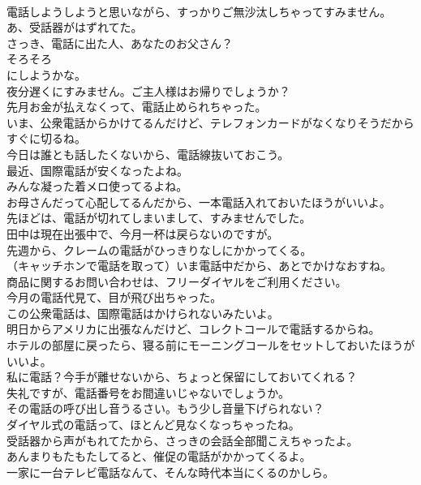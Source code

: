\documentclass[8pt]{extreport}
\begin{document}
\begin{CJK}{UTF8}{min}
\\	電話しようしようと思いながら、すっかりご無沙汰しちゃってすみません。	
\\	あ、受話器がはずれてた。	
\\	さっき、電話に出た人、あなたのお父さん？	
\\	そろそろ
\\	にしようかな。	
\\	夜分遅くにすみません。ご主人様はお帰りでしょうか？	
\\	先月お金が払えなくって、電話止められちゃった。	
\\	いま、公衆電話からかけてるんだけど、テレフォンカードがなくなりそうだからすぐに切るね。	
\\	今日は誰とも話したくないから、電話線抜いておこう。	
\\	最近、国際電話が安くなったよね。	
\\	みんな凝った着メロ使ってるよね。	
\\	お母さんだって心配してるんだから、一本電話入れておいたほうがいいよ。	
\\	先ほどは、電話が切れてしまいまして、すみませんでした。	
\\	田中は現在出張中で、今月一杯は戻らないのですが。	
\\	先週から、クレームの電話がひっきりなしにかかってくる。	
\\	（キャッチホンで電話を取って）いま電話中だから、あとでかけなおすね。	
\\	商品に関するお問い合わせは、フリーダイヤルをご利用ください。	
\\	今月の電話代見て、目が飛び出ちゃった。	
\\	この公衆電話は、国際電話はかけられないみたいよ。	
\\	明日からアメリカに出張なんだけど、コレクトコールで電話するからね。	
\\	ホテルの部屋に戻ったら、寝る前にモーニングコールをセットしておいたほうがいいよ。	
\\	私に電話？今手が離せないから、ちょっと保留にしておいてくれる？	
\\	失礼ですが、電話番号をお間違いじゃないでしょうか。	
\\	その電話の呼び出し音うるさい。もう少し音量下げられない？	
\\	ダイヤル式の電話って、ほとんど見なくなっちゃったね。	
\\	受話器から声がもれてたから、さっきの会話全部聞こえちゃったよ。	
\\	あんまりもたもたしてると、催促の電話がかかってくるよ。	
\\	一家に一台テレビ電話なんて、そんな時代本当にくるのかしら。	

\end{CJK}
\end{document}
